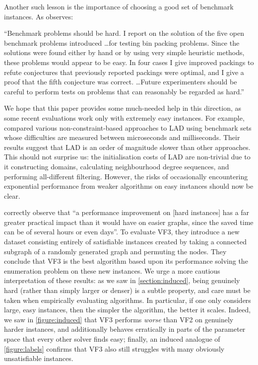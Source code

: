\documentclass[twoside,11pt]{article}
\begin{document}
Another such lesson is the importance of choosing a good set of benchmark instances. As
 observes:

\begin{displayquote}
    ``Benchmark problems should be hard. I report on the solution of the five open benchmark
    problems introduced \ldots for testing bin packing problems. Since the solutions were found
    either by hand or by using very simple heuristic methods, these problems would appear to be
    easy. In four cases I give improved packings to refute conjectures that previously reported
    packings were optimal, and I give a proof that the fifth conjecture was correct. \ldots Future
    experimenters should be careful to perform tests on problems that can reasonably be regarded as
    hard.''
\end{displayquote}

We hope that this paper provides some much-needed help in this direction, as some recent
evaluations work only with extremely easy instances. For example, 
compared various non-constraint-based approaches to LAD using benchmark sets whose
difficulties are measured between microseconds and milliseconds. Their results suggest that LAD is
an order of magnitude slower than other approaches. This should not surprise us: the initialisation
costs of LAD are non-trivial due to it constructing domains, calculating neighbourhood degree
sequences, and performing all-different filtering. However, the risks of occasionally encountering
exponential performance from weaker algorithms on easy instances should now be clear.

 correctly observe that ``a performance improvement on [hard instances] has a
far greater practical impact than it would have on easier graphs, since the saved time can be of
several hours or even days''. To evaluate VF3, they introduce a new dataset consisting entirely of
satisfiable instances created by taking a connected subgraph of a randomly generated graph and
permuting the nodes. They conclude that VF3 is the best algorithm based upon its performance solving
the enumeration problem on these new instances.  We urge a more cautious interpretation of these
results: as we saw in \cref{section:induced}, being genuinely hard (rather than simply larger or
denser) is a subtle property, and care must be taken when empirically evaluating algorithms. In
particular, if one only considers large, easy instances, then the simpler the algorithm, the better
it scales. Indeed, we saw in \cref{figure:induced} that VF3 performs \emph{worse} than VF2 on
genuinely harder instances, and additionally behaves erratically in parts of the parameter space
that every other solver finds easy; finally, an induced analogue of \cref{figure:labels} confirms
that VF3 also still struggles with many obviously unsatisfiable instances.
\end{document}
